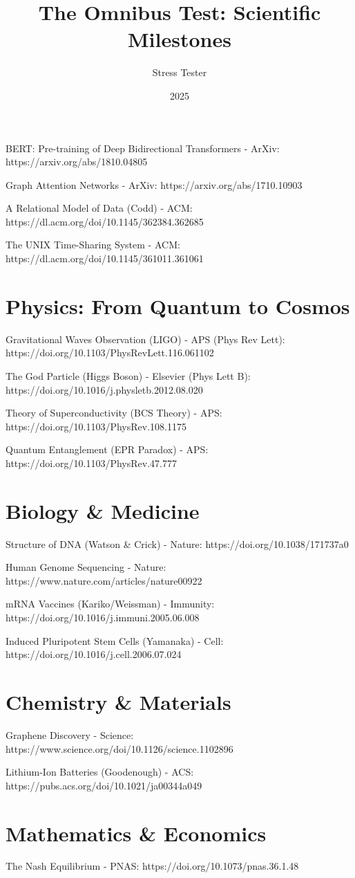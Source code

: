 \documentclass[12pt]{article}
\title{The Omnibus Test: Scientific Milestones}
\author{Stress Tester}
\date{2025}
\begin{document}
\maketitle

BERT: Pre-training of Deep Bidirectional Transformers - ArXiv:
https://arxiv.org/abs/1810.04805

Graph Attention Networks - ArXiv:
https://arxiv.org/abs/1710.10903

A Relational Model of Data (Codd) - ACM:
https://dl.acm.org/doi/10.1145/362384.362685

The UNIX Time-Sharing System - ACM:
https://dl.acm.org/doi/10.1145/361011.361061

\section{Physics: From Quantum to Cosmos}
Gravitational Waves Observation (LIGO) - APS (Phys Rev Lett):
https://doi.org/10.1103/PhysRevLett.116.061102

The God Particle (Higgs Boson) - Elsevier (Phys Lett B):
https://doi.org/10.1016/j.physletb.2012.08.020

Theory of Superconductivity (BCS Theory) - APS:
https://doi.org/10.1103/PhysRev.108.1175

Quantum Entanglement (EPR Paradox) - APS:
https://doi.org/10.1103/PhysRev.47.777

\section{Biology \& Medicine}
 Structure of DNA (Watson & Crick) - Nature:
https://doi.org/10.1038/171737a0

 Human Genome Sequencing - Nature:
https://www.nature.com/articles/nature00922

 mRNA Vaccines (Kariko/Weissman) - Immunity:
https://doi.org/10.1016/j.immuni.2005.06.008

 Induced Pluripotent Stem Cells (Yamanaka) - Cell:
https://doi.org/10.1016/j.cell.2006.07.024

\section{Chemistry \& Materials}
 Graphene Discovery - Science:
https://www.science.org/doi/10.1126/science.1102896

 Lithium-Ion Batteries (Goodenough) - ACS:
https://pubs.acs.org/doi/10.1021/ja00344a049

\section{Mathematics \& Economics}
The Nash Equilibrium - PNAS:
https://doi.org/10.1073/pnas.36.1.48
\end{document}
